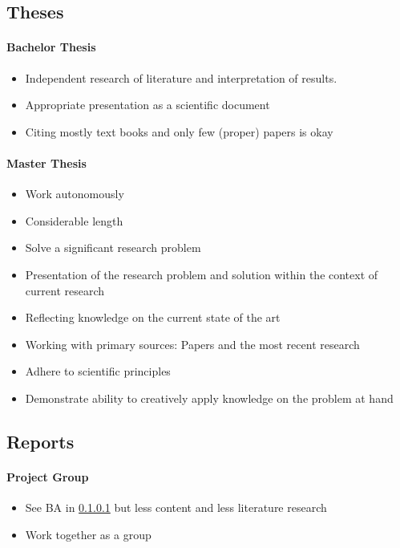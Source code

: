 \documentclass[twocolumn]{mlai-guide}
\begin{document}
\subsection{Theses}

\paragraph{Bachelor Thesis} \label{Scope BA}
\begin{itemize}
	\item Independent research of literature and interpretation of results. 
	\item Appropriate presentation as a scientific document
	\item Citing mostly text books and only few (proper) papers is okay
\end{itemize}

\paragraph{Master Thesis} \label{Scope MA}
\begin{itemize}
	\item Work autonomously
	\item Considerable length
	\item Solve a significant research problem
	\item Presentation of the research problem and solution within the context of current research
	\item Reflecting knowledge on the current state of the art
	\item Working with primary sources: Papers and the most recent research
	\item Adhere to scientific principles
	\item Demonstrate ability to creatively apply knowledge on the problem at hand
\end{itemize}

\subsection{Reports}

\paragraph{Project Group}
	\begin{itemize}
		\item See BA in \ref{Scope BA} but less content and less literature research
		\item Work together as a group
	\end{itemize}
\end{document}
